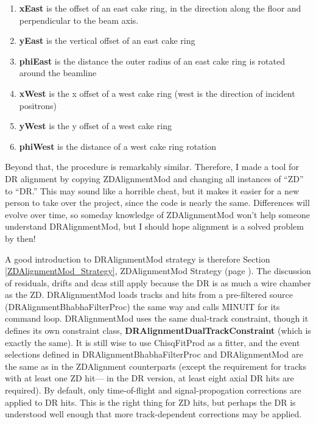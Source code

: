 \documentclass[12pt]{article}
\begin{document}
\begin{enumerate}

  \item {\bf xEast} is the offset of an east cake ring, in the
  direction along the floor and perpendicular to the beam axis.

  \item {\bf yEast} is the vertical offset of an east cake ring

  \item {\bf phiEast} is the distance the outer radius of an east cake
  ring is rotated around the beamline

  \item {\bf xWest} is the x offset of a west cake ring (west is the
  direction of incident positrons)

  \item {\bf yWest} is the y offset of a west cake ring

  \item {\bf phiWest} is the distance of a west cake ring rotation

\end{enumerate}

Beyond that, the procedure is remarkably similar.  Therefore, I made a
tool for DR alignment by copying ZDAlignmentMod and changing all
instances of ``ZD'' to ``DR.''  This may sound like a horrible cheat,
but it makes it easier for a new person to take over the project,
since the code is nearly the same.  Differences will evolve over time,
so someday knowledge of ZDAlignmentMod won't help someone understand
DRAlignmentMod, but I should hope alignment is a solved problem by
then!

A good introduction to DRAlignmentMod strategy is therefore Section
\ref{ZDAlignmentMod_Strategy}, ZDAlignmentMod Strategy (page
\pageref{ZDAlignmentMod_Strategy}).  The discussion of residuals,
drifts and dcas still apply because the DR is as much a wire chamber
as the ZD.  DRAlignmentMod loads tracks and hits from a pre-filtered
source (DRAlignmentBhabhaFilterProc) the same way and calls MINUIT for
its command loop.  DRAlignmentMod uses the same dual-track constraint,
though it defines its own constraint class,
{\bf DRAlignmentDualTrackConstraint} (which is exactly the same).  It
is still wise to use ChisqFitProd as a fitter, and the event
selections defined in DRAlignmentBhabhaFilterProc and DRAlignmentMod
are the same as in the ZDAlignment counterparts (except the
requirement for tracks with at least one ZD hit--- in the DR version,
at least eight axial DR hits are required).  By default, only
time-of-flight and signal-propogation corrections are applied to DR
hits.  This is the right thing for ZD hits, but perhaps the DR is
understood well enough that more track-dependent corrections may be
applied.
\end{document}
